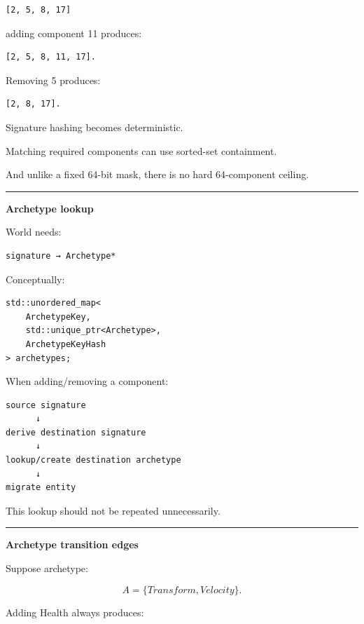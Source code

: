 \begin{verbatim}
[2, 5, 8, 17]
\end{verbatim}

adding component 11 produces:

\begin{verbatim}
[2, 5, 8, 11, 17].
\end{verbatim}

Removing 5 produces:

\begin{verbatim}
[2, 8, 17].
\end{verbatim}

Signature hashing becomes deterministic.

Matching required components can use sorted-set containment.

And unlike a fixed 64-bit mask, there is no hard 64-component ceiling.

\begin{center}\rule{0.5\linewidth}{0.5pt}\end{center}

\textbf{Archetype lookup}

World needs:

\begin{verbatim}
signature → Archetype*
\end{verbatim}

Conceptually:

\begin{verbatim}
std::unordered_map<
    ArchetypeKey,
    std::unique_ptr<Archetype>,
    ArchetypeKeyHash
> archetypes;
\end{verbatim}

When adding/removing a component:

\begin{verbatim}
source signature
      ↓
derive destination signature
      ↓
lookup/create destination archetype
      ↓
migrate entity
\end{verbatim}

This lookup should not be repeated unnecessarily.

\begin{center}\rule{0.5\linewidth}{0.5pt}\end{center}

\textbf{Archetype transition edges}

Suppose archetype:

\[
A=\{Transform,Velocity\}.
\]

Adding Health always produces:

